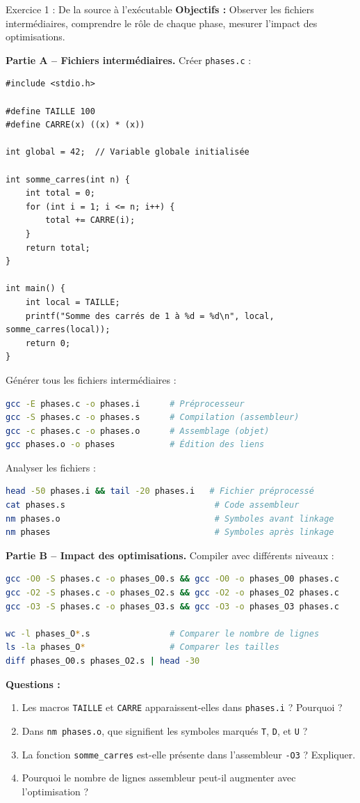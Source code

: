 \documentclass[10pt,a4paper]{article}
\begin{document}
\begin{exercicebox}{Exercice 1 : De la source à l'exécutable}
\textbf{Objectifs :} Observer les fichiers intermédiaires, comprendre le rôle de chaque phase, mesurer l'impact des optimisations.

\textbf{Partie A -- Fichiers intermédiaires.} Créer \texttt{phases.c} :
\begin{lstlisting}
#include <stdio.h>

#define TAILLE 100
#define CARRE(x) ((x) * (x))

int global = 42;  // Variable globale initialisée

int somme_carres(int n) {
    int total = 0;
    for (int i = 1; i <= n; i++) {
        total += CARRE(i);
    }
    return total;
}

int main() {
    int local = TAILLE;
    printf("Somme des carrés de 1 à %d = %d\n", local, somme_carres(local));
    return 0;
}
\end{lstlisting}

Générer tous les fichiers intermédiaires :
\begin{lstlisting}[language=bash]
gcc -E phases.c -o phases.i      # Préprocesseur
gcc -S phases.c -o phases.s      # Compilation (assembleur)
gcc -c phases.c -o phases.o      # Assemblage (objet)
gcc phases.o -o phases           # Édition des liens
\end{lstlisting}

Analyser les fichiers :
\begin{lstlisting}[language=bash]
head -50 phases.i && tail -20 phases.i   # Fichier préprocessé
cat phases.s                              # Code assembleur
nm phases.o                               # Symboles avant linkage
nm phases                                 # Symboles après linkage
\end{lstlisting}

\textbf{Partie B -- Impact des optimisations.} Compiler avec différents niveaux :
\begin{lstlisting}[language=bash]
gcc -O0 -S phases.c -o phases_O0.s && gcc -O0 -o phases_O0 phases.c
gcc -O2 -S phases.c -o phases_O2.s && gcc -O2 -o phases_O2 phases.c
gcc -O3 -S phases.c -o phases_O3.s && gcc -O3 -o phases_O3 phases.c

wc -l phases_O*.s                # Comparer le nombre de lignes
ls -la phases_O*                 # Comparer les tailles
diff phases_O0.s phases_O2.s | head -30
\end{lstlisting}

\textbf{Questions :}
\begin{enumerate}
\item Les macros \texttt{TAILLE} et \texttt{CARRE} apparaissent-elles dans \texttt{phases.i} ? Pourquoi ?
\item Dans \texttt{nm phases.o}, que signifient les symboles marqués \texttt{T}, \texttt{D}, et \texttt{U} ?
\item La fonction \texttt{somme\_carres} est-elle présente dans l'assembleur \texttt{-O3} ? Expliquer.
\item Pourquoi le nombre de lignes assembleur peut-il augmenter avec l'optimisation ?
\end{enumerate}
\end{exercicebox}
\end{document}
